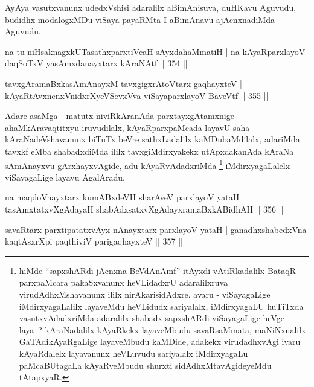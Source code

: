\begin{artha}
AyAya vasutxvanunx udedxVshisi adaralilx aBimAnisuva, duHKavu Aguvudu, budidhx modalogxMDu viSaya payaRMta I aBimAnavu ajAcnxnadiMda Aguvudu.
\end{artha}


\begin{shl}
na tu niHsaknagxkUTasathxparxtiVcaH sAyxdahaMmatiH |
na kAyaRparxlayoV daqSoTxV yasAmxdanayxtarx kAraNAtf \hfill || 354 ||
\end{shl}

\begin{shl}
tavxgAramaBxkasAmAnayxM tavxgigxrA\s toV\s tarx gaqhayxteV |
kAyaRtAvxnenxVnidxrXyeVSevxVva viSayaparxlayoV BaveVtf \hfill || 355 ||
\end{shl}

\begin{artha}
Adare asaMga - matutx niviRkAranAda parxtayxgAtamxnige ahaMkAravaqtitxyu iruvudilalx, kAyaRparxpaMcada layavU saha kAraNadeVshavanunx biTuTx beVre sathxLadalilx kaMDubaMdilalx, adariMda tavxkf eMba shabadxdiMda ililx tavxgiMdirxyakekx utApxdakanAda kAraNa sAmAnayxvu gArxhayxvAgide, adu kAyaRvAdadxriMda \footnote{hiMde ``sapxshARdi jAcnxna BeVdAnAmf'' itAyxdi vAtiRkadalilx BataqR parxpaMcara pakaSxvanunx heVLidadxrU adaralilxruva virudAdhxMshavanunx ililx nirAkarisidAdxre. avaru - viSayagaLige iMdirxyagaLalilx layaveMdu heVLidudx sariyalalx, iMdirxyagaLU huTiTxda vasutxvAdadxriMda adaralilx shabadx sapxshARdi viSayagaLige heVge laya~? kAraNadalilx kAyaRkekx layaveMbudu savaRsaMmata, maNiNxnalilx GaTAdikAyaRgaLige layaveMbudu kaMDide, adakekx virudadhxvAgi ivaru kAyaRdalelx layavanunx heVLuvudu sariyalalx iMdirxyagaLu paMcaBUtagaLa kAyaRveMbudu shurxti sidAdhxMtavAgideyeMdu tAtapxyaR.} iMdirxyagaLalelx viSayagaLige layavu AgalAradu.
\end{artha}

\begin{shl}
na maqdoV\s nayxtarx kumABxdeVH sharAveV parxlayoV yataH |
tasAmxtatxvXgAdayaH shabAdxsatxvXgAdayxramaBxkABidhAH \hfill || 356 ||
\end{shl}

\begin{shl}
savaRtarx parxtipatatxvAyx nAnayxtarx parxlayoV yataH |
ganadhxshabedxVna kaqtAsxrX\s pi paqthiviV parigaqhayxteV \hfill || 357 ||
\end{shl}

